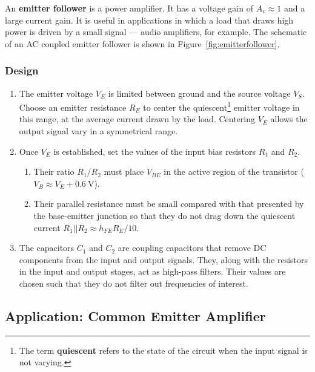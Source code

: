 \documentclass[11pt]{article}
\begin{document}
An \textbf{emitter follower} is a power amplifier. It has a
voltage gain of $A_v \approx 1$ and a large current gain. It is useful
in applications in which a load that draws high power is driven by a
small signal --- audio amplifiers, for example.
The schematic of an AC coupled emitter follower is shown in
Figure~\ref{fig:emitterfollower}. 

\subsubsection*{Design}

\begin{enumerate}
\item The emitter voltage $V_E$ is limited between ground and the
  source voltage $V_S$. Choose an emitter resistance $R_E$ to center
  the quiescent\footnote{The term \textbf{quiescent} refers to the
    state of the circuit when the input signal is not varying.}
  emitter voltage in this range, at the average current
  drawn by the load. Centering $V_E$ allows the output signal vary in
  a symmetrical range.

\item Once $V_E$ is established, set the values of the input bias
  resistors $R_1$ and $R_2$.
  \begin{enumerate}
  \item Their ratio $R_1/R_2$ must place $V_{BE}$ in the active region
    of the transistor ($V_B \approx V_E + 0.6~\mathrm{V}$).

  \item Their parallel resistance must be small compared with that
    presented by the base-emitter junction so that they do not drag 
    down the quiescent current $R_1 || R_2 \approx h_{FE} R_E/ 10$. 
  \end{enumerate}

\item The capacitors $C_1$ and $C_2$ are coupling capacitors that
  remove DC components from the input and output signals. They, along
  with the resistors in the input and output stages, act as high-pass 
  filters. Their values are chosen such that they do not filter out
  frequencies of interest.
\end{enumerate}

\subsection{Application: Common Emitter Amplifier}
\label{sec:commonemitter}
\end{document}
